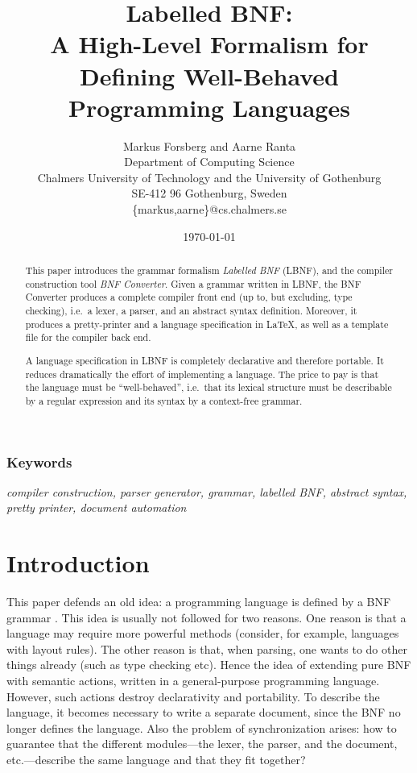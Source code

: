 \documentclass[10pt]{article}
\title{{\Large \bf Labelled BNF: \\
       A High-Level Formalism for Defining Well-Behaved Programming Languages} \\}
\author{ Markus Forsberg and Aarne Ranta \\
  Department of Computing Science \\
  Chalmers University of Technology and the University of Gothenburg \\
  SE-412 96 Gothenburg, Sweden\\
  \{markus,aarne\}@cs.chalmers.se}
\date{\today}
\begin{document}
\maketitle


\begin{abstract}
This paper introduces
the grammar formalism \textit{Labelled BNF} (LBNF), 
and the compiler construction tool
\textit{BNF Converter}.
Given a grammar written in LBNF,
the BNF Converter produces a complete compiler 
front end (up to, but excluding, type checking), 
i.e.\ a lexer, a parser, and an abstract 
syntax definition. Moreover, it produces a pretty-printer 
and a language specification in \LaTeX, as well as 
a template file for the compiler back end.

A language specification in LBNF is completely declarative and therefore
portable. It reduces dramatically the effort of implementing a language. 
The price to pay is that the language must be ``well-behaved'', i.e.\ that
its lexical structure must be describable by a regular expression and
its syntax by a context-free grammar.

\end{abstract}

\subsubsection*{Keywords}

\textit{compiler construction, parser generator, grammar, labelled BNF, 
        abstract syntax, pretty printer, document automation}

\section{Introduction}

This paper defends an old idea: 
a programming language is defined by a BNF grammar \cite{algol}.
This idea is usually not followed for two reasons. One reason is that 
a language may require more 
powerful methods (consider, for example, languages with layout rules). The
other reason is that, when parsing, one wants to do other things already 
(such as type checking etc).
Hence the idea of extending pure BNF with semantic actions, 
written in a general-purpose
programming language. However, such actions destroy declarativity and portability. 
To describe the language, it becomes
necessary to write a separate document, since the BNF no longer defines
the language. Also the problem of synchronization arises: how to
guarantee that the different modules---the lexer, the parser, 
and the document, etc.---describe the same language and that they fit together?
\end{document}
